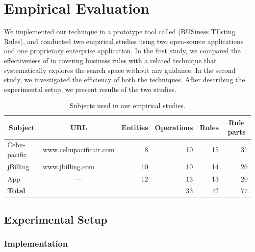 \section{Empirical Evaluation}
\label{sec:eval}

We implemented our technique in a prototype tool called \tool{} (BUSiness
TEsting Rules), and conducted two empirical studies using two open-source
applications and one proprietary enterprise application. In the first study, we
compared the effectiveness of \tool{} in covering business rules with a related
technique that systematically explores the search space without any guidance. In
the second study, we investigated the efficiency of both the techniques. After
describing the experimental setup, we present results of the two studies.

\begin{table}[t]
\caption{Subjects used in our empirical studies.}
\centering
{\scriptsize
\tabcolsep=3pt
\begin{tabular}{|l|l|r|r|r|r|}
\hline
\multicolumn{1}{|c|}{Subject} & \multicolumn{1}{|c|}{URL} & \multicolumn{1}{|c|}{Entities} & \multicolumn{1}{|c|}{Operations} & \multicolumn{1}{|c|}{Rules} & \multicolumn{1}{|c|}{Rule parts} \\
\hline \hline
Cebu-pacific & www.cebupacificair.com 		& 8  & 10 & 15	 & 31 \\
jBilling 		 & www.jbilling.com 					& 10 & 10 & 14 	 & 26 \\
App 				 & \multicolumn{1}{|c|}{---}	& 12 & 13 & 13   & 20 \\
\hline \hline
\textbf{Total} & 													& 	 & 33 & 42   & 77 \\
\hline
\end{tabular}
}
\label{tab:subjects}
\end{table}


\subsection{Experimental Setup}

\subsubsection{Implementation}
\label{sec:impl}

